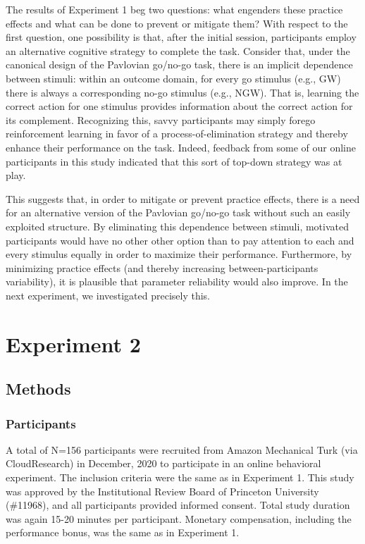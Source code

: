 \documentclass[a4paper,12pt]{article}
\begin{document}
\begin{refsection}[main]
The results of Experiment 1 beg two questions: what engenders these practice effects and what can be done to prevent or mitigate them? With respect to the first question, one possibility is that, after the initial session, participants employ an alternative cognitive strategy to complete the task. Consider that, under the canonical design of the Pavlovian go/no-go task, there is an implicit dependence between stimuli: within an outcome domain, for every go stimulus (e.g., GW) there is always a corresponding no-go stimulus (e.g., NGW). That is, learning the correct action for one stimulus provides information about the correct action for its complement. Recognizing this, savvy participants may simply forego reinforcement learning in favor of a process-of-elimination strategy and thereby enhance their performance on the task. Indeed, feedback from some of our online participants in this study indicated that this sort of top-down strategy was at play.  

This suggests that, in order to mitigate or prevent practice effects, there is a need for an alternative version of the Pavlovian go/no-go task without such an easily exploited structure. By eliminating this dependence between stimuli, motivated participants would have no other other option than to pay attention to each and every stimulus equally in order to maximize their performance. Furthermore, by minimizing practice effects (and thereby increasing between-participants variability), it is plausible that parameter reliability would also improve. In the next experiment, we investigated precisely this.

\section*{Experiment 2}

\subsection*{Methods}

\subsubsection*{Participants}

A total of N=156 participants were recruited from Amazon Mechanical Turk (via CloudResearch) in December, 2020 to participate in an online behavioral experiment. The inclusion criteria were the same as in Experiment 1. This study was approved by the Institutional Review Board of Princeton University (\#11968), and all participants provided informed consent. Total study duration was again 15-20 minutes per participant. Monetary compensation, including the performance bonus, was the same as in Experiment 1. 


\end{refsection}
\end{document}

